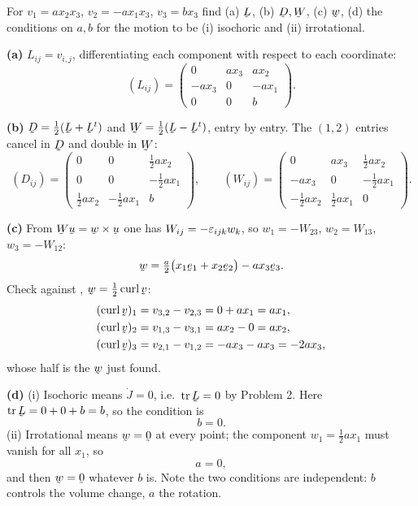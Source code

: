 \begin{problem}
For $v_{1}=ax_{2}x_{3}$, $v_{2}=-ax_{1}x_{3}$, $v_{3}=bx_{3}$ find
(a) $\bL$, (b) $\bD,\bW$, (c) $\bw$, (d) the conditions on $a,b$ for the
motion to be (i) isochoric and (ii) irrotational.
\end{problem}

\begin{solution}
\textbf{(a)} $L_{ij}=v_{i,j}$, differentiating each component with respect
to each coordinate:
\[
   (L_{ij})=\begin{pmatrix}
      0&ax_{3}&ax_{2}\\
     -ax_{3}&0&-ax_{1}\\
      0&0&b\end{pmatrix}.
\]

\textbf{(b)} $\bD=\tfrac12(\bL+\bL^{t})$ and $\bW=\tfrac12(\bL-\bL^{t})$,
entry by entry. The $(1,2)$ entries cancel in $\bD$ and double in $\bW$:
\[
   (D_{ij})=\begin{pmatrix}
      0&0&\tfrac12 ax_{2}\\
      0&0&-\tfrac12 ax_{1}\\
      \tfrac12 ax_{2}&-\tfrac12 ax_{1}&b\end{pmatrix},
   \qquad
   (W_{ij})=\begin{pmatrix}
      0&ax_{3}&\tfrac12 ax_{2}\\
     -ax_{3}&0&-\tfrac12 ax_{1}\\
     -\tfrac12 ax_{2}&\tfrac12 ax_{1}&0\end{pmatrix}.
\]

\textbf{(c)} From $\bW\bu=\bw\times\bu$ one has $W_{ij}=-\varepsilon_{ijk}w_{k}$,
so $w_{1}=-W_{23}$, $w_{2}=W_{13}$, $w_{3}=-W_{12}$:
\[
   \bw=\tfrac{a}{2}\big(x_{1}\be_{1}+x_{2}\be_{2}\big)-a x_{3}\be_{3}.
\]
Check against , $\bw=\tfrac12\crl\bv$:
\[
\begin{aligned}
   (\crl\bv)_{1}&=v_{3,2}-v_{2,3}=0+ax_{1}=ax_{1},\\
   (\crl\bv)_{2}&=v_{1,3}-v_{3,1}=ax_{2}-0=ax_{2},\\
   (\crl\bv)_{3}&=v_{2,1}-v_{1,2}=-ax_{3}-ax_{3}=-2ax_{3},
\end{aligned}
\]
whose half is the $\bw$ just found.

\textbf{(d)} (i) Isochoric means $\dot J=0$, i.e.\ $\tr\bL=0$ by
Problem 2. Here $\tr\bL=0+0+b=b$, so the condition is
\[
   b=0 .
\]
(ii) Irrotational means $\bw=\bze$ at every point; the component
$w_{1}=\tfrac12 ax_{1}$ must vanish for all $x_{1}$, so
\[
   a=0 ,
\]
and then $\bw=\bze$ whatever $b$ is. Note the two conditions are
independent: $b$ controls the volume change, $a$ the rotation.
\end{solution}

